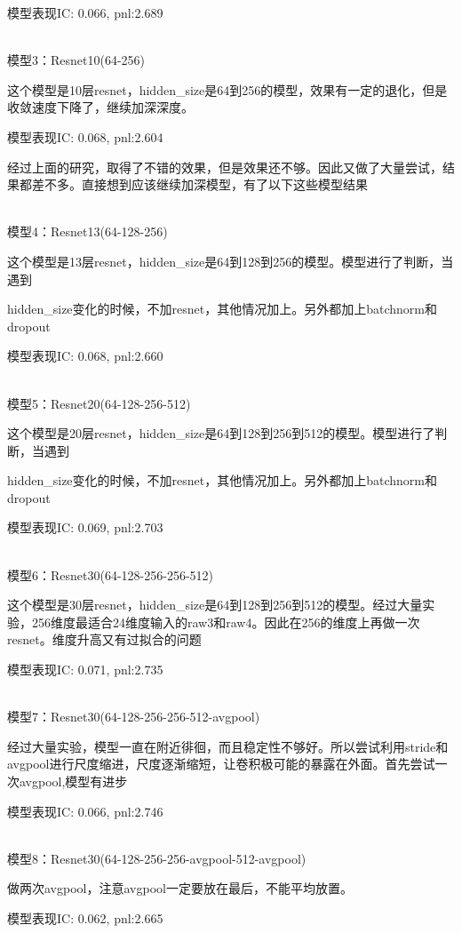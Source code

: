 \documentclass[11pt]{ctexart}
\begin{document}
模型表现{\kaishu \small IC: 0.066, pnl:2.689}

~\\
模型3：Resnet10(64-256)

这个模型是10层resnet，hidden\_size是64到256的模型，效果有一定的退化，但是收敛速度下降了，继续加深深度。

模型表现{\kaishu \small IC: 0.068, pnl:2.604}


经过上面的研究，取得了不错的效果，但是效果还不够。因此又做了大量尝试，结果都差不多。直接想到应该继续加深模型，有了以下这些模型结果

~\\
模型4：Resnet13(64-128-256)

这个模型是13层resnet，hidden\_size是64到128到256的模型。模型进行了判断，当遇到 \par hidden\_size变化的时候，不加resnet，其他情况加上。另外都加上batchnorm和dropout

模型表现{\kaishu \small IC: 0.068, pnl:2.660}

~\\
模型5：Resnet20(64-128-256-512)

这个模型是20层resnet，hidden\_size是64到128到256到512的模型。模型进行了判断，当遇到 \par hidden\_size变化的时候，不加resnet，其他情况加上。另外都加上batchnorm和dropout

模型表现{\kaishu \small IC: 0.069, pnl:2.703}

~\\
模型6：Resnet30(64-128-256-256-512)

这个模型是30层resnet，hidden\_size是64到128到256到512的模型。经过大量实验，256维度最适合24维度输入的raw3和raw4。因此在256的维度上再做一次resnet。维度升高又有过拟合的问题

模型表现{\kaishu \small IC: 0.071, pnl:2.735}

~\\
模型7：Resnet30(64-128-256-256-512-avgpool)

经过大量实验，模型一直在附近徘徊，而且稳定性不够好。所以尝试利用stride和avgpool进行尺度缩进，尺度逐渐缩短，让卷积极可能的暴露在外面。首先尝试一次avgpool,模型有进步

模型表现{\kaishu \small IC: 0.066, pnl:2.746}

~\\
模型8：Resnet30(64-128-256-256-avgpool-512-avgpool)

做两次avgpool，注意avgpool一定要放在最后，不能平均放置。

模型表现{\kaishu \small IC: 0.062, pnl:2.665}
\end{document}

